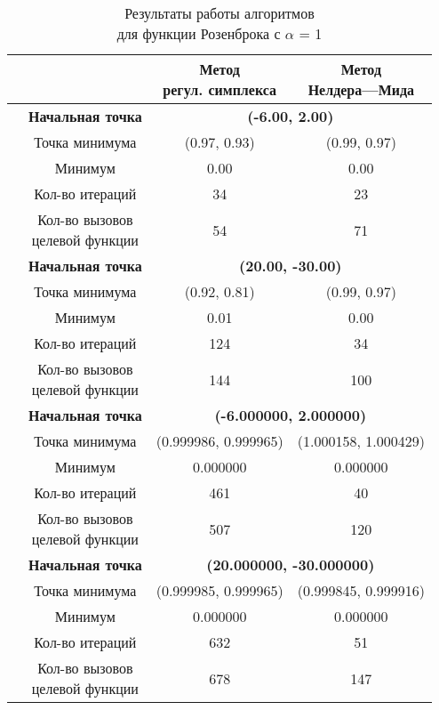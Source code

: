 \begin{table}[H]
        \centering
        \vspace*{-1.5em}
        \caption{Результаты работы алгоритмов\\для функции Розенброка с $\alpha$ = 1}
        \footnotesize
        \begin{tabular}{|c|c|c|c|}
        \hline
        & &\makecell{Метод\\регул. симплекса} &\makecell{Метод\\Нелдера---Мида} \\
        \hline
	\multirow{8}{*}{\rotatebox[origin=c]{90}{$\varepsilon = 0.01$}}&\textbf{Начальная точка} &\multicolumn{2}{c|}{\textbf{(-6.00, 2.00)}}\\
	\cline{2-4}
	&Точка минимума &(0.97, 0.93) &(0.99, 0.97) \\ 
	\cline{2-4}
	&Минимум &0.00 &0.00 \\ 
	\cline{2-4}
	&Кол-во итераций &34 &23 \\ 
	\cline{2-4}
	&\makecell{Кол-во вызовов\\целевой функции} &54 &71 \\ 
	\cline{2-4}
\cline{2-4}&\textbf{Начальная точка} &\multicolumn{2}{c|}{\textbf{(20.00, -30.00)}}\\
	\cline{2-4}
	&Точка минимума &(0.92, 0.81) &(0.99, 0.97) \\ 
	\cline{2-4}
	&Минимум &0.01 &0.00 \\ 
	\cline{2-4}
	&Кол-во итераций &124 &34 \\ 
	\cline{2-4}
	&\makecell{Кол-во вызовов\\целевой функции} &144 &100 \\ 
	\cline{2-4}
	\hline
	\multirow{8}{*}{\rotatebox[origin=c]{90}{$\varepsilon = 1e-06$}}&\textbf{Начальная точка} &\multicolumn{2}{c|}{\textbf{(-6.000000, 2.000000)}}\\
	\cline{2-4}
	&Точка минимума &(0.999986, 0.999965) &(1.000158, 1.000429) \\ 
	\cline{2-4}
	&Минимум &0.000000 &0.000000 \\ 
	\cline{2-4}
	&Кол-во итераций &461 &40 \\ 
	\cline{2-4}
	&\makecell{Кол-во вызовов\\целевой функции} &507 &120 \\ 
	\cline{2-4}
\cline{2-4}&\textbf{Начальная точка} &\multicolumn{2}{c|}{\textbf{(20.000000, -30.000000)}}\\
	\cline{2-4}
	&Точка минимума &(0.999985, 0.999965) &(0.999845, 0.999916) \\ 
	\cline{2-4}
	&Минимум &0.000000 &0.000000 \\ 
	\cline{2-4}
	&Кол-во итераций &632 &51 \\ 
	\cline{2-4}
	&\makecell{Кол-во вызовов\\целевой функции} &678 &147 \\ 
	\cline{2-4}
	\hline

\end{tabular}
\end{table}


